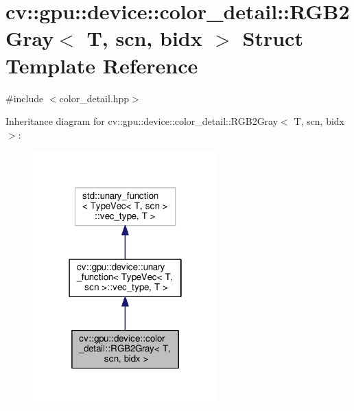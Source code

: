 \hypertarget{structcv_1_1gpu_1_1device_1_1color__detail_1_1RGB2Gray}{\section{cv\-:\-:gpu\-:\-:device\-:\-:color\-\_\-detail\-:\-:R\-G\-B2\-Gray$<$ T, scn, bidx $>$ Struct Template Reference}
\label{structcv_1_1gpu_1_1device_1_1color__detail_1_1RGB2Gray}
}


{\ttfamily \#include $<$color\-\_\-detail.\-hpp$>$}



Inheritance diagram for cv\-:\-:gpu\-:\-:device\-:\-:color\-\_\-detail\-:\-:R\-G\-B2\-Gray$<$ T, scn, bidx $>$\-:\nopagebreak
\begin{figure}[H]
\begin{center}
\leavevmode
\includegraphics[width=202pt]{structcv_1_1gpu_1_1device_1_1color__detail_1_1RGB2Gray__inherit__graph}
\end{center}
\end{figure}


